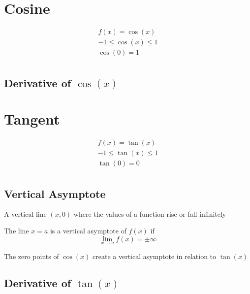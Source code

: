 \documentclass[12pt letter]{report}
\begin{document}
\section{Cosine}

\begin{align*}
	f(x) = \cos(x)                \\
	-1 \leq        \cos(x) \leq 1 \\
	\cos(0) = 1                   \\
\end{align*}

\subsection{Derivative of $\cos(x)$}




\section{Tangent}

\begin{align*}
	f(x) = \tan(x)                \\
	-1 \leq        \tan(x) \leq 1 \\
	\tan(0) = 0                   \\
\end{align*}

\subsection{Vertical Asymptote}

\begin{note}
	A vertical line $(x, 0)$ where the values of a function rise or fall infinitely
\end{note}

The line $x=a$ is a vertical asymptote of $f(x)$ if
\[
	\lim_{x \to a} f(x) = \pm \infty
\]

The zero points of $\cos(x)$ create a vertical asymptote in relation to $\tan(x)$

\subsection{Derivative of $\tan(x)$}

\end{document}
